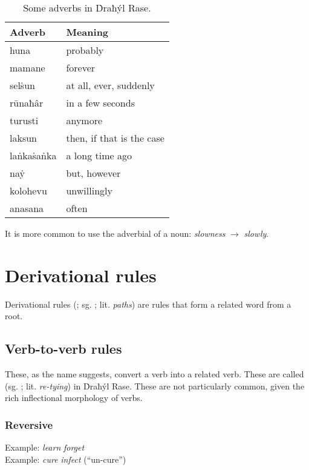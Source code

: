 \documentclass{book}
\begin{document}
\begin{table}[h]
    \caption{Some adverbs in Ḋraħýl Rase.}
    \centering
    \begin{tabular}{|l|l|}
        \hline
        Adverb & Meaning \\
        \hline
        huna & probably \\
        mamane & forever \\
        selṡun & at all, ever, suddenly \\
        rūnaħâr & in a few seconds \\
        turusti & anymore \\
        laksun & then, if that is the case \\
        laṅkaṡaṅka & a long time ago \\
        naẏ & but, however \\
        kolohevu & unwillingly \\
        anasana & often \\
        \hline
    \end{tabular}
\end{table}

It is more common to use the adverbial of a noun:  \emph{slowness} $\rightarrow$  \emph{slowly}.

\chapter{Derivational rules}

Derivational rules (; sg. ; lit. \emph{paths}) are rules that form a related word from a root.

\section{Verb-to-verb rules}

These, as the name suggests, convert a verb into a related verb. These are called  (sg. ; lit. \emph{re-tying}) in Ḋraħýl Rase. These are not particularly common, given the rich inflectional morphology of verbs.

\subsection{Reversive}

Example:  \emph{learn} \ra{}  \emph{forget} \\
Example:  \emph{cure} \ra{}  \emph{infect} (``un-cure'') \\
~
\end{document}

